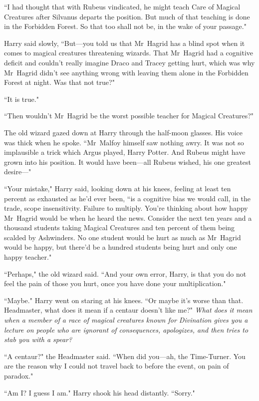 ``I had thought that with Rubeus vindicated, he might teach Care of Magical Creatures after Silvanus departs the position. But much of that teaching is done in the Forbidden Forest. So that too shall not be, in the wake of your passage."

Harry said slowly, ``But—you told us that Mr~Hagrid has a blind spot when it comes to magical creatures threatening wizards. That Mr~Hagrid had a cognitive deficit and couldn't really imagine Draco and Tracey getting hurt, which was why Mr~Hagrid didn't see anything wrong with leaving them alone in the Forbidden Forest at night. Was that not true?"

``It is true."

``Then wouldn't Mr~Hagrid be the worst possible teacher for Magical Creatures?"

The old wizard gazed down at Harry through the half-moon glasses. His voice was thick when he spoke. ``Mr~Malfoy himself saw nothing awry. It was not so implausible a trick which Argus played, Harry Potter. And Rubeus might have grown into his position. It would have been—all Rubeus wished, his one greatest desire—"

``Your mistake," Harry said, looking down at his knees, feeling at least ten percent as exhausted as he'd ever been, ``is a cognitive bias we would call, in the trade, scope insensitivity. Failure to multiply. You're thinking about how happy Mr~Hagrid would be when he heard the news. Consider the next ten years and a thousand students taking Magical Creatures and ten percent of them being scalded by Ashwinders. No one student would be hurt as much as Mr~Hagrid would be happy, but there'd be a hundred students being hurt and only one happy teacher."

``Perhaps," the old wizard said. ``And your own error, Harry, is that you do not feel the pain of those you hurt, once you have done your multiplication."

``Maybe." Harry went on staring at his knees. ``Or maybe it's worse than that. Headmaster, what does it mean if a centaur doesn't like me?" \emph{What does it mean when a member of a race of magical creatures known for Divination gives you a lecture on people who are ignorant of consequences, apologizes, and then tries to stab you with a spear?}

``A centaur?" the Headmaster said. ``When did you—ah, the Time-Turner. You are the reason why I could not travel back to before the event, on pain of paradox."

``Am I? I guess I am." Harry shook his head distantly. ``Sorry."

